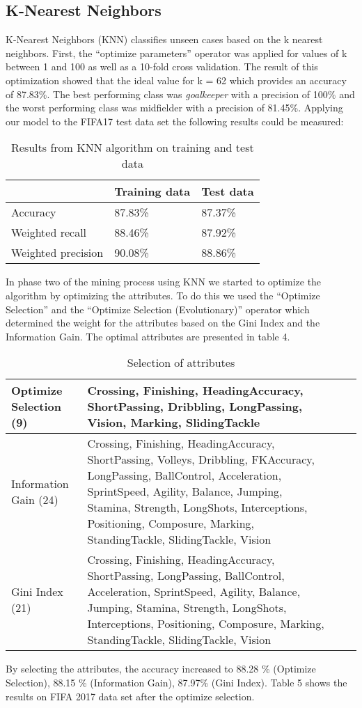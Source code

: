 \subsection{K-Nearest Neighbors}
\label{sec:KNN}
K-Nearest Neighbors (KNN) classifies unseen cases based on the k nearest neighbors. 
First, the ``optimize parameters'' operator was applied for values of k between 1 and 100 as well as a 10-fold cross validation. The result of this optimization showed that the ideal value for k = 62 which provides an accuracy of 87.83\%. The best performing class was \textit{goalkeeper} with a precision of 100\% and the worst performing class was midfielder with a precision of 81.45\%. 
Applying our model to the FIFA17 test data set the following results could be measured:\\
\begin{table}[H]
\label{Tab:knn}
\centering
\begin{tabular}{@{}lll@{}}
\toprule
                   & Training data & Test data \\ \midrule
Accuracy           & 87.83\%       & 87.37\%   \\
Weighted recall    & 88.46\%       & 87.92\%   \\
Weighted precision & 90.08\%       & 88.86\%   \\ \bottomrule
\end{tabular}
\caption{Results from KNN algorithm on training and test data}
\end{table}
In phase two of the mining process using KNN we started to optimize the algorithm by optimizing the attributes.
To do this we used the ``Optimize Selection'' and the ``Optimize Selection (Evolutionary)'' operator which determined the weight for the attributes based on the Gini Index and the Information Gain.
The optimal attributes are presented in table 4.
\begin{table}[H]
\begin{tabular}{p{3.5cm}|p{7.5cm}l|l}
\hline 
Optimize Selection (9) & Crossing, Finishing, HeadingAccuracy, ShortPassing, Dribbling, LongPassing, Vision, Marking, SlidingTackle\\
\hline
Information Gain (24)& Crossing, Finishing, HeadingAccuracy, ShortPassing, Volleys, Dribbling, FKAccuracy, LongPassing, BallControl, Acceleration, SprintSpeed, Agility, Balance, Jumping, Stamina, Strength, LongShots, Interceptions, Positioning, Composure, Marking, StandingTackle, SlidingTackle, Vision \\
\hline 
Gini Index (21) & Crossing, Finishing, HeadingAccuracy, ShortPassing, LongPassing, BallControl, Acceleration, SprintSpeed, Agility, Balance, Jumping, Stamina, Strength, LongShots, Interceptions, Positioning, Composure, Marking, StandingTackle, SlidingTackle, Vision\\ \hline
\end{tabular}
\label{Tab:knn2}
\caption{Selection of attributes}
\end{table}	
By selecting the attributes, the accuracy increased to 88.28 \% (Optimize Selection), 88.15 \% (Information Gain), 87.97\% (Gini Index). Table 5 shows the results on FIFA 2017 data set after the optimize selection.

